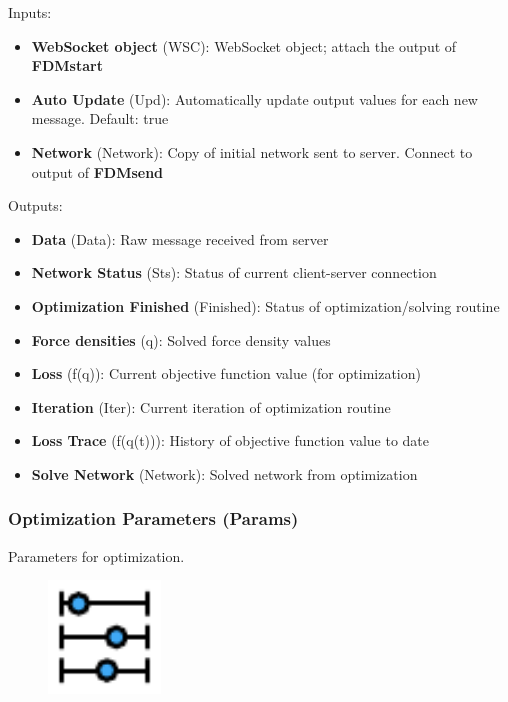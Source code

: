 Inputs:
\begin{itemize}
    \setlength\itemsep{0.05em}
    \item \textbf{WebSocket object} (WSC): WebSocket object; attach the output of \textbf{FDMstart}
    \item \textbf{Auto Update} (Upd): Automatically update output values for each new message. {\color{gray} Default: true}
    \item \textbf{Network} (Network): Copy of initial network sent to server. Connect to output of \textbf{FDMsend}
\end{itemize}

Outputs:
\begin{itemize}
    \setlength\itemsep{0.05em}
    \item \textbf{Data} (Data): Raw message received from server
    \item \textbf{Network Status} (Sts): Status of current client-server connection
    \item \textbf{Optimization Finished} (Finished): Status of optimization/solving routine
    \item \textbf{Force densities} (q): Solved force density values
    \item \textbf{Loss} (f(q)): Current objective function value (for optimization)
    \item \textbf{Iteration} (Iter): Current iteration of optimization routine
    \item \textbf{Loss Trace} (f(q(t))): History of objective function value to date
    \item \textbf{Solve Network} (Network): Solved network from optimization
\end{itemize}

\subsubsection{Optimization Parameters (Params)}
Parameters for optimization.

\begin{figure}[h]
    \centering
    \includegraphics[width=3cm]{Figures/parameters}
\end{figure}

